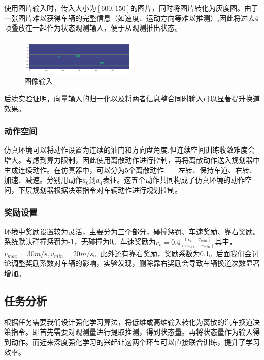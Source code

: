 \documentclass[letterpaper, 10 pt, conference]{ieeeconf}  %
\begin{document}
使用图片输入时，传入大小为$[600,150]$的图片，同时将图片转化为灰度图。由于一张图片难以获得车辆的完整信息（如速度、运动方向等难以推测）,因此将过去4帧叠放在一起作为状态观测输入，便于从观测推出状态。

\begin{figure}[htb] %
    \centering %
    \includegraphics[width=0.5\textwidth]{fig/1.png} %
    \caption{图像输入} %
    \label{Fig.main1} %
\end{figure}

后续实验证明，向量输入的归一化以及将两者信息整合同时输入可以显著提升换道效果。

\subsubsection{动作空间}
仿真环境可以将动作设置为连续的油门和方向盘角度,但连续空间训练收敛难度会增大。考虑到算力限制，因此使用离散动作进行控制，再将离散动作送入规划器中生成连续动作。在仿真器中，可以分为5个离散动作——左转、保持车道、右转、加速、减速。分别用动作$a_0$到$a_4$表征。这五个动作共同构成了仿真环境的动作空间，下层规划器根据决策指令对车辆动作进行规划控制。

\subsubsection{奖励设置}
环境中奖励设置较为灵活，主要分为三个部分，碰撞惩罚、车速奖励、靠右奖励。系统默认碰撞惩罚为-1，无碰撞为0。车速奖励为$r_v = 0.4\frac{(v_t-v_{min})}{(v_{max}-v_{min})}$其中，$v_{max} = 30m/s,v_{min}=20m/s$。此外还有靠右奖励，奖励系数为0.1。后面我们会讨论调整奖励系数对车辆的影响，实验发现，删除靠右奖励会导致车辆换道次数显著增加。

\subsection{任务分析}
根据任务需要我们设计强化学习算法，将低维或高维输入转化为离散的汽车换道决策指令。即首先需要对观测量进行提取推测，得到状态量。再将状态量作为输入得到动作。而近来深度强化学习的兴起让这两个环节可以直接联合训练，提升了学习效率。
\end{document}
